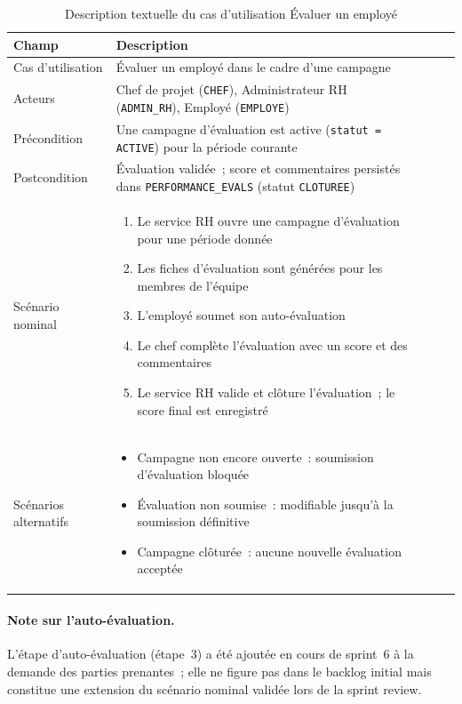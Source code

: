 \begin{table}[H]
\centering
\caption{Description textuelle du cas d'utilisation Évaluer un employé}
\label{tab:uc_evaluation}
\begin{tabularx}{\textwidth}{VlVLV}
\hline
\textbf{Champ} & \textbf{Description} \\
\hline
Cas d'utilisation & Évaluer un employé dans le cadre d'une campagne \\
\hline
Acteurs & Chef de projet (\texttt{CHEF}), Administrateur RH (\texttt{ADMIN\_RH}), Employé (\texttt{EMPLOYE}) \\
\hline
Précondition & Une campagne d'évaluation est active (\texttt{statut = ACTIVE}) pour la période courante \\
\hline
Postcondition & Évaluation validée~; score et commentaires persistés dans \texttt{PERFORMANCE\_EVALS} (statut \texttt{CLOTUREE}) \\
\hline
Scénario nominal &
\begin{enumerate}[leftmargin=*,nosep]
  \item Le service RH ouvre une campagne d'évaluation pour une période donnée
  \item Les fiches d'évaluation sont générées pour les membres de l'équipe
  \item L'employé soumet son auto-évaluation
  \item Le chef complète l'évaluation avec un score et des commentaires
  \item Le service RH valide et clôture l'évaluation~; le score final est enregistré
\end{enumerate} \\
\hline
Scénarios alternatifs &
\begin{itemize}[leftmargin=*,nosep]
  \item Campagne non encore ouverte~: soumission d'évaluation bloquée
  \item Évaluation non soumise~: modifiable jusqu'à la soumission définitive
  \item Campagne clôturée~: aucune nouvelle évaluation acceptée
\end{itemize} \\
\hline
\end{tabularx}
\end{table}

\paragraph{Note sur l'auto-évaluation.}
L'étape d'auto-évaluation (étape~3) a été ajoutée en cours de sprint~6 à la
demande des parties prenantes~; elle ne figure pas dans le backlog initial mais
constitue une extension du scénario nominal validée lors de la sprint review.

